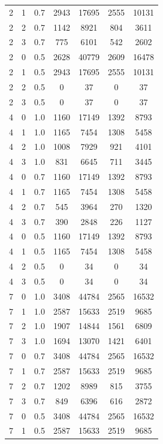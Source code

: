 \documentclass[conference,twoside]{IEEEtran}
\begin{document}
\begin{table}
\begin{longtable}{c c c S S S S}
        2 & 1 & 0.7 & 2943 & 17695 & 2555 & 10131 \\
        2 & 2 & 0.7 & 1142 & 8921 & 804 & 3611 \\
        2 & 3 & 0.7 & 775 & 6101 & 542 & 2602 \\
        2 & 0 & 0.5 & 2628 & 40779 & 2609 & 16478 \\
        2 & 1 & 0.5 & 2943 & 17695 & 2555 & 10131 \\
        2 & 2 & 0.5 & 0 & 37 & 0 & 37 \\
        2 & 3 & 0.5 & 0 & 37 & 0 & 37 \\
        4 & 0 & 1.0 & 1160 & 17149 & 1392 & 8793 \\
        4 & 1 & 1.0 & 1165 & 7454 & 1308 & 5458 \\
        4 & 2 & 1.0 & 1008 & 7929 & 921 & 4101 \\
        4 & 3 & 1.0 & 831 & 6645 & 711 & 3445 \\
        4 & 0 & 0.7 & 1160 & 17149 & 1392 & 8793 \\
        4 & 1 & 0.7 & 1165 & 7454 & 1308 & 5458 \\
        4 & 2 & 0.7 & 545 & 3964 & 270 & 1320 \\
        4 & 3 & 0.7 & 390 & 2848 & 226 & 1127 \\
        4 & 0 & 0.5 & 1160 & 17149 & 1392 & 8793 \\
        4 & 1 & 0.5 & 1165 & 7454 & 1308 & 5458 \\
        4 & 2 & 0.5 & 0 & 34 & 0 & 34 \\
        4 & 3 & 0.5 & 0 & 34 & 0 & 34 \\
        7 & 0 & 1.0 & 3408 & 44784 & 2565 & 16532 \\
        7 & 1 & 1.0 & 2587 & 15633 & 2519 & 9685 \\
        7 & 2 & 1.0 & 1907 & 14844 & 1561 & 6809 \\
        7 & 3 & 1.0 & 1694 & 13070 & 1421 & 6401 \\
        7 & 0 & 0.7 & 3408 & 44784 & 2565 & 16532 \\
        7 & 1 & 0.7 & 2587 & 15633 & 2519 & 9685 \\
        7 & 2 & 0.7 & 1202 & 8989 & 815 & 3755 \\
        7 & 3 & 0.7 & 849 & 6396 & 616 & 2872 \\
        7 & 0 & 0.5 & 3408 & 44784 & 2565 & 16532 \\
        7 & 1 & 0.5 & 2587 & 15633 & 2519 & 9685 \\

\end{longtable}
\end{table}
\end{document}
